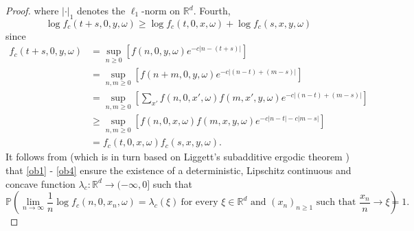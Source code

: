 \documentclass[a4paper]{amsart}
\numberwithin{equation}{section}
\theoremstyle{plain}
\theoremstyle{remark}
\begin{document}
\begin{proof}
	where $|\cdot|_1$ denotes the $\ell_1$-norm on $\mathbb{R}^d$. Fourth, 
	\begin{equation}\label{ob4}
	\log f_c(t+s,0,y,\omega) \ge \log f_c(t,0,x,\omega) + \log f_c(s,x,y,\omega)
	\end{equation}
	since
	\begin{align*}
	f_c(t+s,0,y,\omega) &= \sup_{n\ge0}\left[f(n,0,y,\omega)e^{-c|n-(t+s)|}\right]\\
	&= \sup_{n,m\ge0}\left[f(n+m,0,y,\omega)e^{-c|(n-t)+(m-s)|}\right]\\
	&= \sup_{n,m\ge0}\left[\sum_{x'}f(n,0,x',\omega)f(m,x',y,\omega)e^{-c|(n-t)+(m-s)|}\right]\\
	&\ge \sup_{n,m\ge0}\left[f(n,0,x,\omega)f(m,x,y,\omega)e^{-c|n-t| - c|m-s|}\right]\\
	&= f_c(t,0,x,\omega)f_c(s,x,y,\omega).
	\end{align*}
	It follows from \cite[Theorem 2.1]{Var2003} (which is in turn based on Liggett's subadditive ergodic theorem \cite{Lig1985}) that \eqref{ob1} - \eqref{ob4} ensure the existence of a deterministic, Lipschitz continuous and concave function $\lambda_c:\mathbb{R}^d\to(-\infty,0]$ such that
	\begin{equation}\label{importel}
	\mathbb{P}\left(\lim_{n\to\infty}\frac1{n}\log f_c(n,0,x_n,\omega) = \lambda_c(\xi)\ \text{for every $\xi\in\mathbb{R}^d$ and $(x_n)_{n\ge1}$ such that $\frac{x_n}{n}\to\xi$}\right) = 1.
	\end{equation}
	

\end{proof}
\end{document}
